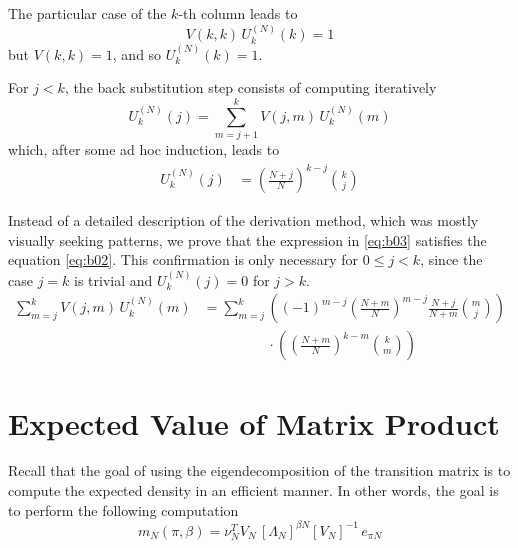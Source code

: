 \documentclass{article}
\newcommand{\ppar}[1]{\left( #1 \right)}
\newcommand{\spar}[1]{\left[ #1 \right]}
\begin{document}
The particular case of the $k$-th column leads to
\begin{equation}
    V(k,k)\, U_k^{(N)}(k) = 
    1
\end{equation}
but $V(k,k) = 1$, and so $U_k^{(N)}(k) = 1$.

For $j<k$, the back substitution step consists of computing iteratively
\begin{equation}
    U_k^{(N)}(j) = \sum_{m=j+1}^k V(j,m)\, U_k^{(N)}(m)
\end{equation}
which, after some ad hoc induction, leads to
\begin{align}
U_k^{(N)}(j)
    &=
    \ppar{\frac{N+j}{N}}^{k-j} \binom{k}{j}
    \label{eq:b03}
\end{align}

Instead of a detailed description of the derivation method, which was mostly visually seeking patterns, we prove that the expression in \eqref{eq:b03} satisfies the equation \eqref{eq:b02}.
%
This confirmation is only necessary for $0\leq j<k$, since the case $j=k$ is trivial and $U_k^{(N)}(j)=0$ for $j> k$.
\begin{align*}
    \sum_{m=j}^k V(j,m)\, U_k^{(N)}(m)
    &=
    \sum_{m=j}^k 
    \ppar{ (-1)^{m-j} \ppar{\frac{N+m}{N}}^{m-j} \frac{N+j}{N+m} \binom{m}{j} }
    \\
    &\phantom{=}
    \phantom{\sum_{m=j}^k} \cdot
    \ppar{\ppar{\frac{N+m}{N}}^{k-m} \binom{k}{m}}
\end{align*}






\section{Expected Value of Matrix Product}
\label{ap:product}

Recall that the goal of using the eigendecomposition of the transition matrix is to compute the expected density in an efficient manner.
%
In other words, the goal is to perform the following computation
\begin{equation}
    m_N(\pi, \beta) = 
    {\nu_N^T 
    V_N}\, \spar{\Lambda_N}^{\beta N} \spar{V_N}^{-1}\,e_{\pi N}
\end{equation}
\end{document}
